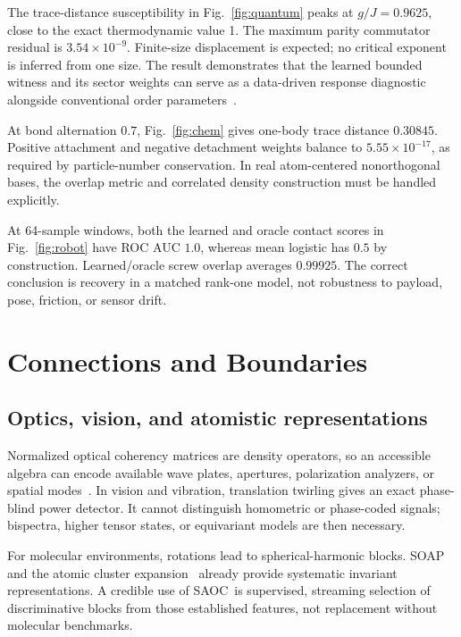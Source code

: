 \documentclass[letterpaper,journal]{IEEEtran}
\newcommand{\SAOC}{\textsc{SAOC}}
\begin{document}
The trace-distance susceptibility in Fig.~\ref{fig:quantum} peaks at
$g/J=0.9625$, close to the exact thermodynamic value 1. The maximum parity
commutator residual is $3.54\times10^{-9}$. Finite-size displacement is
expected; no critical exponent is inferred from one size. The result
demonstrates that the learned bounded witness and its sector weights can serve
as a data-driven response diagnostic alongside conventional order
parameters~\cite{carrasquilla2017}.

At bond alternation $0.7$, Fig.~\ref{fig:chem} gives one-body trace distance
$0.30845$. Positive attachment and negative detachment weights balance to
$5.55\times10^{-17}$, as required by particle-number conservation. In real
atom-centered nonorthogonal bases, the overlap metric and correlated density
construction must be handled explicitly.

At 64-sample windows, both the learned and oracle contact scores in
Fig.~\ref{fig:robot} have ROC AUC $1.0$, whereas mean logistic has $0.5$ by
construction. Learned/oracle screw overlap averages $0.99925$. The correct
conclusion is recovery in a matched rank-one model, not robustness to payload,
pose, friction, or sensor drift.

\section{Connections and Boundaries}

\subsection{Optics, vision, and atomistic representations}

Normalized optical coherency matrices are density operators, so an accessible
algebra can encode available wave plates, apertures, polarization analyzers,
or spatial modes~\cite{mandelwolf1995}. In vision and vibration, translation
twirling gives an exact phase-blind power detector. It cannot distinguish
homometric or phase-coded signals; bispectra, higher tensor states, or
equivariant models are then necessary.

For molecular environments, rotations lead to spherical-harmonic blocks.
SOAP~\cite{bartok2013} and the atomic cluster
expansion~\cite{drautz2019} already provide systematic invariant
representations. A credible use of \SAOC\ is supervised, streaming selection
of discriminative blocks from those established features, not replacement
without molecular benchmarks.
\end{document}
